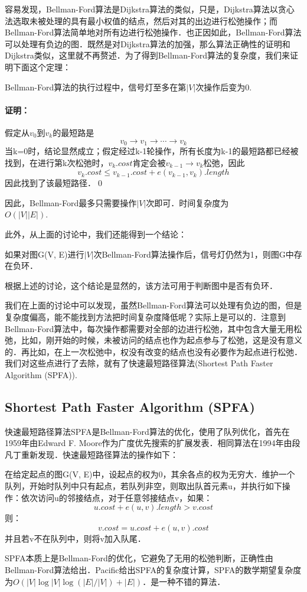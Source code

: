 \documentclass {article}
\begin{document}
容易发现，Bellman-Ford算法是Dijkstra算法的类似，只是，Dijkstra算法以贪心法选取未被处理的具有最小权值的结点，然后对其的出边进行松弛操作；而Bellman-Ford算法简单地对所有边进行松弛操作．\cite {ref7}也正因如此，Bellman-Ford算法可以处理有负边的图．既然是对Dijkstra算法的加强，那么算法正确性的证明和Dijkstra类似，这里就不再赘述．为了得到Bellman-Ford算法的复杂度，我们来证明下面这个定理：
\begin {extra} Bellman-Ford算法的执行过程中，信号灯至多在第$|V|$次操作后变为0. \end {extra}
\paragraph {证明：} 假定从$v_0$到$v_k$的最短路是$$v_0\rightarrow v_1\rightarrow\cdots\rightarrow v_k$$当k=0时，结论显然成立；假定经过k-1轮操作，所有长度为k-1的最短路都已经被找到，在进行第k次松弛时，$v_k.cost$肯定会被$v_{k-1}\rightarrow v_k$松弛，因此$$ v_k.cost\le v_{k-1}.cost+e(v_{k-1}, v_k).length $$因此找到了该最短路径．\qed

因此，Bellman-Ford最多只需要操作$|V|$次即可．时间复杂度为\\$O(|V||E|)$.\cite {ref7}

此外，从上面的讨论中，我们还能得到一个结论：\begin {extra} 如果对图G(V, E)进行$|V|$次Bellman-Ford算法操作后，信号灯仍然为1，则图G中存在负环．\end {extra}

根据上述的讨论，这个结论是显然的，该方法可用于判断图中是否有负环．

我们在上面的讨论中可以发现，虽然Bellman-Ford算法可以处理有负边的图，但是复杂度偏高，能不能找到方法把时间复杂度降低呢？实际上是可以的．注意到Bellman-Ford算法中，每次操作都需要对全部的边进行松弛，其中包含大量无用松弛，比如，刚开始的时候，未被访问的结点也作为起点参与了松弛，这是没有意义的．再比如，在上一次松弛中，权没有改变的结点也没有必要作为起点进行松弛．我们对这些点进行了去除，就有了快速最短路径算法(Shortest Path Faster Algorithm (SPFA)).

\subsection {Shortest Path Faster Algorithm (SPFA)}

快速最短路径算法SPFA是Bellman-Ford算法的优化，使用了队列优化，首先在1959年由Edward F. Moore作为广度优先搜索的扩展发表．\cite {ref8}相同算法在1994年由段凡丁重新发现．\cite {ref9}快速最短路径算法的操作如下：
\begin {theorm} 在给定起点的图G(V, E)中，设起点的权为0，其余各点的权为无穷大．维护一个队列，开始时队列中只有起点，若队列非空，则取出队首元素u，并执行如下操作：依次访问u的邻接结点，对于任意邻接结点v，如果：$$ u.cost+e(u, v).length>v.cost $$则：$$ v.cost=u.cost+e(u, v).cost $$并且若v不在队列中，则将v加入队尾．\end {theorm}
SPFA本质上是Bellman-Ford的优化，它避免了无用的松弛判断，正确性由Bellman-Ford算法给出．Pacific给出SPFA的复杂度计算，SPFA的数学期望复杂度为$O(|V|\log|V|\log(|E|/|V|)+|E|)$．\cite {ref10}是一种不错的算法．
\end{document}
